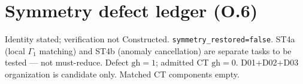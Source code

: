 \section{Symmetry defect ledger (O.6)}
\label{sec:O-defect}

Identity stated; verification not Constructed. \texttt{symmetry\_restored=false}.
ST4a (local $\Gamma_{1}$ matching) and ST4b (anomaly cancellation) are separate tasks to be
tested --- not must-reduce. Defect $\mathrm{gh}=1$; admitted CT $\mathrm{gh}=0$.
D01+D02+D03 organization is candidate only. Matched CT components empty.
